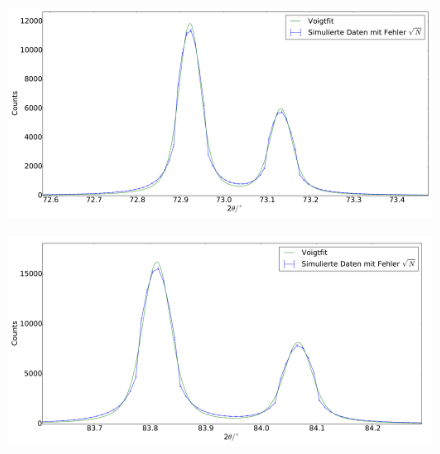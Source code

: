\begin{figure}[H]
\begin{minipage}{.52\textwidth}
  \centering
  \includegraphics[scale=0.18]{Simulation_Germaniumpulver_5}
  \label{fig:pul_sim_ger_5}
\end{minipage}
\hspace{0.2cm}
\begin{minipage}{.52\textwidth}
  \centering
  \includegraphics[scale=0.18]{Simulation_Germaniumpulver_6}
  \label{fig:pul_sim_ger_6}
\end{minipage}
\end{figure}
